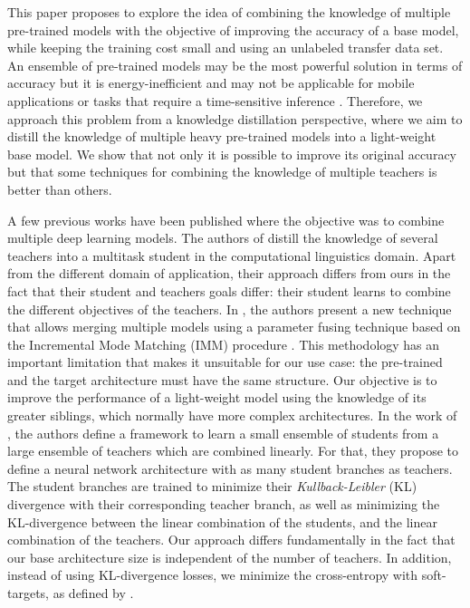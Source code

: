 \documentclass{elsarticle}
\begin{document}
	 This paper proposes to explore the idea of combining the knowledge of multiple pre-trained models with the objective of improving the accuracy of a base model, while keeping the training cost small and using an unlabeled transfer data set. 	An ensemble of pre-trained models may be the most powerful solution in terms of accuracy but it is energy-inefficient and may not be applicable for mobile applications or tasks that require a time-sensitive inference \citep{sanchez2020}. Therefore, we approach this problem from a knowledge distillation perspective, where we aim to distill the knowledge of multiple heavy pre-trained models into a light-weight base model. We show that not only it is possible to improve its original accuracy but that some techniques for combining the knowledge of multiple teachers is better than others.

	A few previous works have been published where the objective was to combine multiple deep learning models. The authors of \citep{liu2020} distill the knowledge of several teachers into a multitask student in the computational linguistics domain. Apart from the different domain of application, their approach differs from ours in the fact that their student and teachers goals differ: their student learns to combine the different objectives of the teachers. In \citep{geyer2019}, the authors present a new technique that allows merging multiple models using a parameter fusing technique based on the Incremental Mode Matching (IMM) procedure \citep{lee2017}. This methodology has an important limitation that makes it unsuitable for our use case: the pre-trained and the target architecture must have the same structure. Our objective is to improve the performance of a light-weight model using the knowledge of its greater siblings, which normally have more complex architectures. In the work of \citep{asif2019}, the authors define a framework to learn a small ensemble of students from a large ensemble of teachers which are combined linearly. For that, they propose to define a neural network architecture with as many student branches as teachers. The student branches are trained to minimize their \textit{Kullback-Leibler} (KL) divergence with their corresponding teacher branch, as well as minimizing the KL-divergence between the linear combination of the students, and the linear combination of the teachers. Our approach differs fundamentally in the fact that our base architecture size is independent of the number of teachers. In addition, instead of using KL-divergence losses, we minimize the cross-entropy with soft-targets, as defined by \citep{hinton2015}.
\end{document}
